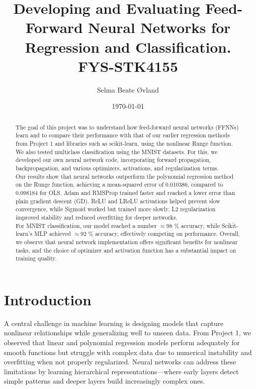 \documentclass[amssymb,twocolumn,aps,floatfix]{revtex4-2}
\begin{document}
	
\title{Developing and Evaluating Feed-Forward Neural Networks for Regression and Classification. \\
    \normalsize FYS-STK4155}
\date{\today}               
\author{Selma Beate Øvland}

\newpage
	
\begin{abstract}

The goal of this project was to understand how feed-forward neural networks (FFNNs) learn and to compare their performance with that of our earlier regression methods from Project 1 and libraries such as scikit-learn, using the nonlinear Runge function. We also tested multiclass classification using the MNIST datasets. For this, we developed our own neural network code, incorporating forward propagation, backpropagation, and various optimizers, activations, and regularization terms. \\

Our results show that neural networks outperform the polynomial regression method on the Runge function, achieving a mean-squared error of 0.010386, compared to 0.098184 for OLS. Adam and RMSProp trained faster and reached a lower error than plain gradient descent (GD). ReLU and LReLU activations helped prevent slow convergence, while Sigmoid worked but trained more slowly. L2 regularization improved stability and reduced overfitting for deeper networks. \\

For MNIST classification, our model reached a number $\approx 98$ \% accuracy, while Scikit-learn's MLP achieved $\approx 92$ \% accuracy, effectively competing on performance. Overall, we observe that neural network implementation offers significant benefits for nonlinear tasks, and the choice of optimizer and activation function has a substantial impact on training quality. 

\end{abstract}


\maketitle

\section{Introduction}
A central challenge in machine learning is designing models that capture nonlinear relationships while generalizing well to unseen data. From Project 1, we observed that linear and polynomial regression models perform adequately for smooth functions but struggle with complex data due to numerical instability and overfitting when not properly regularized. Neural networks can address these limitations by learning hierarchical representations—where early layers detect simple patterns and deeper layers build increasingly complex ones.
\end{document}
